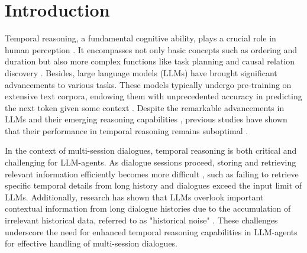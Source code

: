 \section{Introduction}

Temporal reasoning, a fundamental cognitive ability, plays a crucial role in human perception \cite{hoerl2019thinking}. 
It encompasses not only basic concepts such as ordering and duration but also more complex functions like task planning and causal relation discovery \cite{vila1994survey}. Besides, large language models (LLMs) have brought significant advancements to various tasks. These models typically undergo pre-training on extensive text corpora, endowing them with unprecedented accuracy in predicting the next token given some context \cite{ge2023supervised}.
Despite the remarkable advancements in LLMs and their emerging reasoning capabilities \cite{huang2023towards}, previous studies have shown that their performance in temporal reasoning remains suboptimal \cite{chu-etal-2024-timebench,qiu2024large}.

In the context of multi-session dialogues, temporal reasoning is both critical and challenging for LLM-agents. As dialogue sessions proceed, storing and retrieving relevant information efficiently becomes more difficult \cite{maharana-etal-2024-evaluating},
such as failing to retrieve specific temporal details from long history and dialogues exceed the input limit of LLMs. Additionally, research has shown that LLMs overlook important contextual information from long dialogue histories due to the accumulation of irrelevant historical data, referred to as "historical noise" \cite{wang2023enhancing}. 
These challenges underscore the need for enhanced temporal reasoning capabilities in LLM-agents for effective handling of multi-session dialogues.




